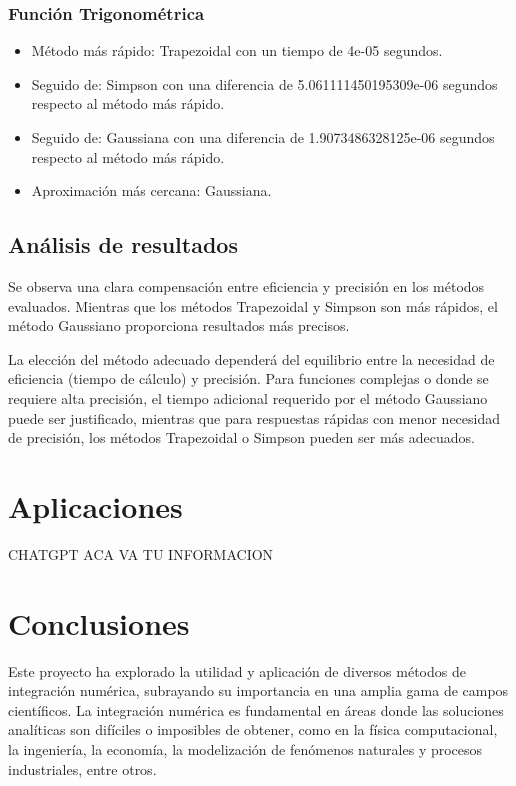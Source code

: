 \documentclass[a4paper]{article}
\begin{document}
    \subsubsection{Función Trigonométrica}
    \begin{itemize}
        \item Método más rápido: Trapezoidal con un tiempo de 4e-05 segundos.
        \item Seguido de: Simpson con una diferencia de 5.061111450195309e-06 segundos respecto al método más rápido.
        \item Seguido de: Gaussiana con una diferencia de 1.9073486328125e-06 segundos respecto al método más rápido.
        \item Aproximación más cercana: Gaussiana. 
    \end{itemize}
    
    \subsection{Análisis de resultados}
    Se observa una clara compensación entre eficiencia y precisión en los métodos evaluados. Mientras que los métodos Trapezoidal y Simpson son más rápidos, el método Gaussiano proporciona resultados más precisos. 
    
    La elección del método adecuado dependerá del equilibrio entre la necesidad de eficiencia (tiempo de cálculo) y precisión. Para funciones complejas o donde se requiere alta precisión, el tiempo adicional requerido por el método Gaussiano puede ser justificado, mientras que para respuestas rápidas con menor necesidad de precisión, los métodos Trapezoidal o Simpson pueden ser más adecuados.
    
    \section{Aplicaciones}

    CHATGPT ACA VA TU INFORMACION
     
    \section{Conclusiones}
    \label{sec:Conclusiones}
    Este proyecto ha explorado la utilidad y aplicación de diversos métodos de integración numérica, subrayando su importancia en una amplia gama de campos científicos. La integración numérica es fundamental en áreas donde las soluciones analíticas son difíciles o imposibles de obtener, como en la física computacional, la ingeniería, la economía, la modelización de fenómenos naturales y procesos industriales, entre otros.
\end{document}
